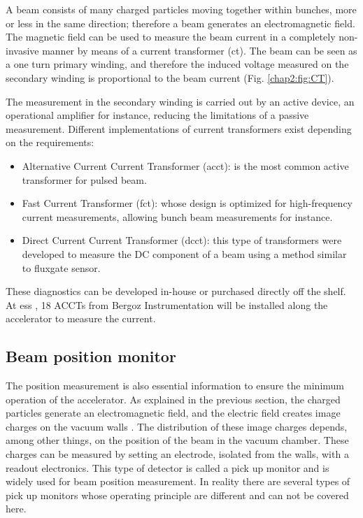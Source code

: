 \begin{refsection}
  A beam consists of many charged particles moving together within bunches, more or less in the same direction; therefore a beam generates an electromagnetic field. The magnetic field can be used to measure the beam current in a completely non-invasive manner by means of a current transformer (\acrshort{ct}). The beam can be seen as a one turn primary winding, and therefore the induced voltage measured on the secondary winding is proportional to the beam current (Fig. \ref{chap2:fig:CT}). 
  
  
  The measurement in the secondary winding is carried out by an active device, an operational amplifier for instance, reducing the limitations of a passive measurement. Different implementations of current transformers exist depending on the requirements:
  \begin{itemize}
    \item Alternative Current Current Transformer (\acrshort{acct}): is the most common active transformer for pulsed beam.
    \item Fast Current Transformer (\acrshort{fct}): whose design is optimized for high-frequency current measurements, allowing bunch beam measurements for instance.
    \item Direct Current Current Transformer (\acrshort{dcct}): this type of transformers were developed to measure the DC component \cite{Unser1969} of a beam using a method similar to fluxgate sensor.
  \end{itemize}

  These diagnostics can be developed in-house or purchased directly off the shelf. At \acrshort{ess} \cite{Hassanzadegan:IPAC2018-WEPAF088}, 18 ACCTs from Bergoz Instrumentation \cite{bergoz2019} will be installed along the accelerator to measure the current. %

  \subsection{Beam position monitor}
  The position measurement is also essential information to ensure the minimum operation of the accelerator. As explained in the previous section, the charged particles generate an electromagnetic field, and the electric field creates image charges on the vacuum walls \cite{strehl2006}. The distribution of these image charges depends, among other things, on the position of the beam in the vacuum chamber. These charges can be measured by setting an electrode, isolated from the walls, with a readout electronics. This type of detector is called a pick up monitor and is widely used for beam position measurement. In reality there are several types of pick up monitors whose operating principle are different and can not be covered here.


\end{refsection}
